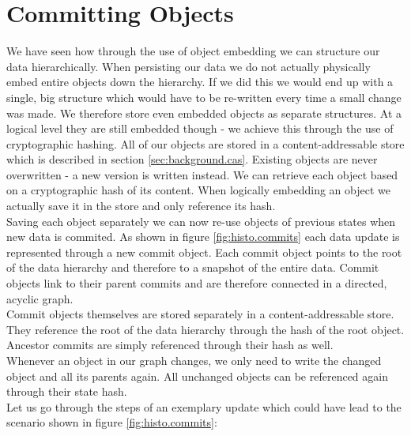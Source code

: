 
\section{Committing Objects}
\label{sec:histo.committing}
We have seen how through the use of object embedding we can structure our data hierarchically.
When persisting our data we do not actually physically embed entire objects down the hierarchy.
If we did this we would end up with a single, big structure which would have to be re-written every time a small change was made.
We therefore store even embedded objects as separate structures.
At a logical level they are still embedded though - we achieve this through the use of cryptographic hashing.
All of our objects are stored in a content-addressable store which is described in section \ref{sec:background.cas}.
Existing objects are never overwritten - a new version is written instead.
We can retrieve each object based on a cryptographic hash of its content.
When logically embedding an object we actually save it in the store and only reference its hash.\\
Saving each object separately we can now re-use objects of previous states when new data is commited.
As shown in figure \ref{fig:histo.commits} each data update is represented through a new commit object.
Each commit object points to the root of the data hierarchy and therefore to a snapshot of the entire data.
Commit objects link to their parent commits and are therefore connected in a directed, acyclic graph.\\
Commit objects themselves are stored separately in a content-addressable store.
They reference the root of the data hierarchy through the hash of the root object.
Ancestor commits are simply referenced through their hash as well.\\
Whenever an object in our graph changes, we only need to write the changed object and all its parents again.
All unchanged objects can be referenced again through their state hash.\\

Let us go through the steps of an exemplary update which could have lead to the scenario shown in figure \ref{fig:histo.commits}:

